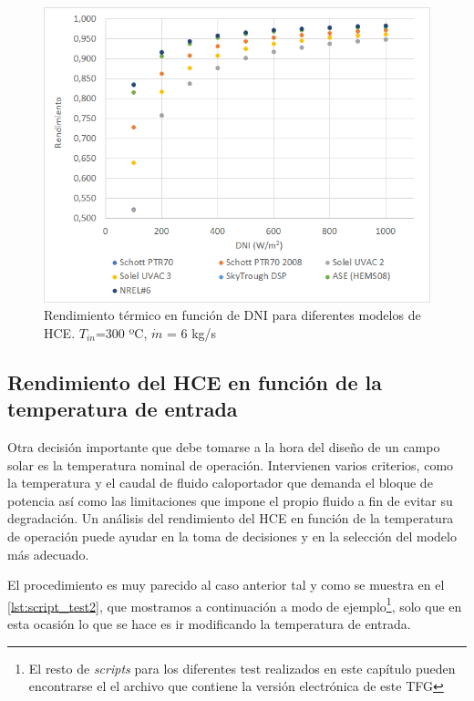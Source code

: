 \begin{figure}[H]
\includegraphics[width=0.9\linewidth]{images/rendimiento_dni.png}
\caption[Rendimiento térmico en función de DNI para diferentes modelos de HCE]{Rendimiento térmico en función de DNI para diferentes modelos de HCE. $T_{in}$=300 ºC, $\dot m$ = 6 kg/s} 
\label{fig:test1a}
\end{figure}


\subsection{Rendimiento del HCE en función de la temperatura de entrada}

Otra decisión importante que debe tomarse a la hora del diseño de  un campo solar es la temperatura nominal de operación. Intervienen varios criterios, como la temperatura y el caudal de fluido caloportador que demanda el bloque de potencia así como las limitaciones que impone el propio fluido a fin de evitar su degradación.  Un análisis del rendimiento del HCE en función de la temperatura de operación puede ayudar en la toma de decisiones y  en la selección del modelo más adecuado.

El procedimiento es muy parecido al caso anterior tal y como se muestra en el \ref{lst:script_test2}, que mostramos a continuación a modo de ejemplo\footnote{El resto de \emph{scripts} para los diferentes test realizados en este capítulo pueden encontrarse el el archivo que contiene la versión electrónica de este TFG}, solo que en esta ocasión lo que se hace es ir modificando la temperatura de entrada. 

